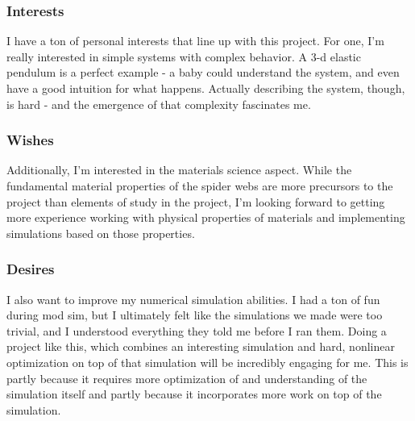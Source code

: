 \subsubsection{Interests}
I have a ton of personal interests that line up with this project. For one, I'm really interested in simple systems with complex behavior. A 3-d elastic pendulum is a perfect example - a baby could understand the system, and even have a good intuition for what happens. Actually describing the system, though, is hard - and the emergence of that complexity fascinates me.

\subsubsection{Wishes}
Additionally, I'm interested in the materials science aspect. While the fundamental material properties of the spider webs are more precursors to the project than elements of study in the project, I'm looking forward to getting more experience working with physical properties of materials and implementing simulations based on those properties.

\subsubsection{Desires}
I also want to improve my numerical simulation abilities. I had a ton of fun during mod sim, but I ultimately felt like the simulations we made were too trivial, and I understood everything they told me before I ran them. Doing a project like this, which combines an interesting simulation and hard, nonlinear optimization on top of that simulation will be incredibly engaging for me. This is partly because it requires more optimization of and understanding of the simulation itself and partly because it incorporates more work on top of the simulation.
